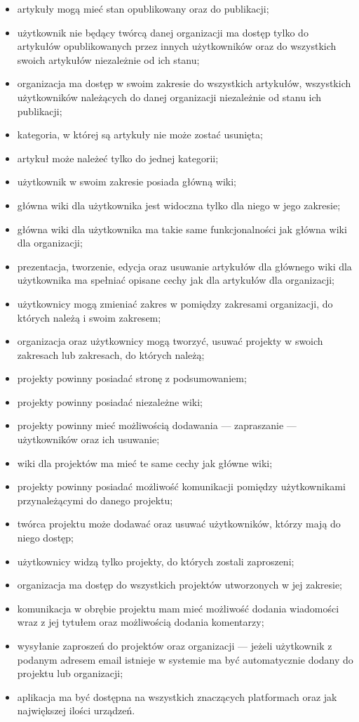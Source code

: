 \begin{itemize}
 \item artykuły mogą mieć stan opublikowany oraz do publikacji;
 \item użytkownik nie będący twórcą danej organizacji ma dostęp tylko do artykułów opublikowanych przez innych użytkowników oraz do wszystkich swoich artykułów niezależnie od ich stanu;
 \item organizacja ma dostęp w swoim zakresie do wszystkich artykułów, wszystkich użytkowników należących do danej organizacji niezależnie od stanu ich publikacji;
 \item kategoria, w której są artykuły nie może zostać usunięta;
 \item artykuł może należeć tylko do jednej kategorii;
 \item użytkownik w swoim zakresie posiada główną wiki;
 \item główna wiki dla użytkownika jest widoczna tylko dla niego w jego zakresie;
 \item główna wiki dla użytkownika ma takie same funkcjonalności jak główna wiki dla organizacji;
 \item prezentacja, tworzenie, edycja oraz usuwanie artykułów dla głównego wiki dla użytkownika ma spełniać opisane cechy jak dla artykułów dla organizacji; 
 \item użytkownicy mogą zmieniać zakres w pomiędzy zakresami organizacji, do których należą i swoim zakresem;
 \item organizacja oraz użytkownicy mogą tworzyć, usuwać projekty w swoich zakresach lub zakresach, do których należą;
 \item projekty powinny posiadać stronę z podsumowaniem;
 \item projekty powinny posiadać niezależne wiki;
 \item projekty powinny mieć możliwością dodawania --- zapraszanie --- użytkowników oraz ich usuwanie;
 \item wiki dla projektów ma mieć te same cechy jak główne wiki;
 \item projekty powinny posiadać możliwość komunikacji pomiędzy użytkownikami przynależącymi do danego projektu;
 \item twórca projektu może dodawać oraz usuwać użytkowników, którzy mają do niego dostęp;
 \item użytkownicy widzą tylko projekty, do których zostali zaproszeni;
 \item organizacja ma dostęp do wszystkich projektów utworzonych w jej zakresie;
 \item komunikacja w obrębie projektu mam mieć możliwość dodania wiadomości wraz z jej tytułem oraz możliwością dodania komentarzy;
 \item wysyłanie zaproszeń do projektów oraz organizacji --- jeżeli użytkownik z podanym adresem email istnieje w systemie ma być automatycznie dodany do projektu lub organizacji;
 \item aplikacja ma być dostępna na wszystkich znaczących platformach oraz jak największej ilości urządzeń.
\end{itemize} 

